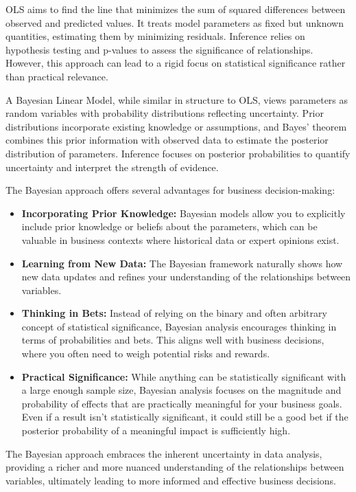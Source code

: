 \documentclass[
  letterpaper,
  DIV=11,
  numbers=noendperiod]{scrreprt}
\begin{document}
OLS aims to find the line that minimizes the sum of squared differences
between observed and predicted values. It treats model parameters as
fixed but unknown quantities, estimating them by minimizing residuals.
Inference relies on hypothesis testing and p-values to assess the
significance of relationships. However, this approach can lead to a
rigid focus on statistical significance rather than practical relevance.

A Bayesian Linear Model, while similar in structure to OLS, views
parameters as random variables with probability distributions reflecting
uncertainty. Prior distributions incorporate existing knowledge or
assumptions, and Bayes' theorem combines this prior information with
observed data to estimate the posterior distribution of parameters.
Inference focuses on posterior probabilities to quantify uncertainty and
interpret the strength of evidence.

The Bayesian approach offers several advantages for business
decision-making:

\begin{itemize}
\item
  \textbf{Incorporating Prior Knowledge:} Bayesian models allow you to
  explicitly include prior knowledge or beliefs about the parameters,
  which can be valuable in business contexts where historical data or
  expert opinions exist.
\item
  \textbf{Learning from New Data:} The Bayesian framework naturally
  shows how new data updates and refines your understanding of the
  relationships between variables.
\item
  \textbf{Thinking in Bets:} Instead of relying on the binary and often
  arbitrary concept of statistical significance, Bayesian analysis
  encourages thinking in terms of probabilities and bets. This aligns
  well with business decisions, where you often need to weigh potential
  risks and rewards.
\item
  \textbf{Practical Significance:} While anything can be statistically
  significant with a large enough sample size, Bayesian analysis focuses
  on the magnitude and probability of effects that are practically
  meaningful for your business goals. Even if a result isn't
  statistically significant, it could still be a good bet if the
  posterior probability of a meaningful impact is sufficiently high.
\end{itemize}

The Bayesian approach embraces the inherent uncertainty in data
analysis, providing a richer and more nuanced understanding of the
relationships between variables, ultimately leading to more informed and
effective business decisions.
\end{document}
